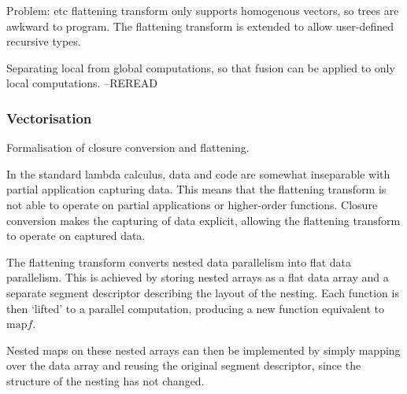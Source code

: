 


Problem: \nesl etc flattening transform only supports homogenous vectors, so trees are awkward to program.
The flattening transform is extended to allow user-defined recursive types.

Separating local from global computations, so that fusion can be applied to only local computations.
--REREAD





\subsubsection{Vectorisation}

Formalisation of closure conversion and flattening. 

In the standard lambda calculus, data and code are somewhat inseparable with partial application capturing data.
This means that the flattening transform is not able to operate on partial applications or higher-order functions.
Closure conversion makes the capturing of data explicit, allowing the flattening transform to operate on captured data.

The flattening transform converts nested data parallelism into flat data parallelism.
This is achieved by storing nested arrays as a flat data array and a separate segment descriptor describing the layout of the nesting.
Each function is then `lifted' to a parallel computation, producing a new function equivalent to $\mbox{map} f$.

Nested maps on these nested arrays can then be implemented by simply mapping over the data array and reusing the original segment descriptor,
since the structure of the nesting has not changed.

